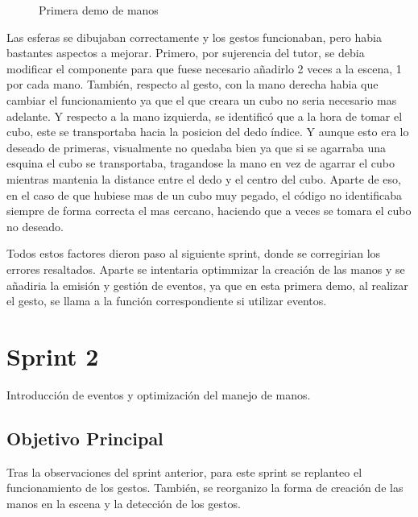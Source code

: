 \documentclass[a4paper, 12pt]{book}
\begin{document}
\begin{figure}[H] 
  \centering
  \fbox{\rule{0pt}{150pt} \rule{0.7\textwidth}{0pt}} 
  \caption{Primera demo de manos}
  \label{fig:sprint1}
\end{figure}

Las esferas se dibujaban correctamente y los gestos funcionaban, pero habia bastantes aspectos a mejorar. Primero, por sujerencia del tutor,
se debia modificar el componente para que fuese necesario añadirlo 2 veces a la escena, 1 por cada mano. También, respecto al gesto, con la mano derecha habia que cambiar el funcionamiento
ya que el que creara un cubo no seria necesario mas adelante. Y respecto a la mano izquierda, se identificó que a la hora de tomar el cubo, este se transportaba hacia la posicion del dedo índice. 
Y aunque esto era lo deseado de primeras, visualmente no quedaba bien ya que si se agarraba una esquina el cubo se transportaba, tragandose la mano en vez de agarrar el cubo mientras mantenia la distance entre el dedo y el centro del cubo. 
Aparte de eso, en el caso de que hubiese mas de un cubo muy pegado, el código no identificaba siempre de forma correcta el mas cercano, haciendo que a veces se tomara el cubo no deseado.

Todos estos factores dieron paso al siguiente sprint, donde se corregirian los errores resaltados. Aparte se intentaria optimmizar la creación de las manos y se añadiria la emisión y gestión de eventos, ya que en esta primera demo, al realizar el gesto, se llama a la función correspondiente si utilizar eventos. 

\section{Sprint 2}
\label{sec:sprint2}
Introducción de eventos y optimización del manejo de manos. 

\subsection{Objetivo Principal}
\label{subsec:objetivo-principal2}
Tras la observaciones del sprint anterior, para este sprint se replanteo el funcionamiento de los gestos. También, se reorganizo la forma de creación de las manos en la escena y la detección de los gestos. 
\end{document}

